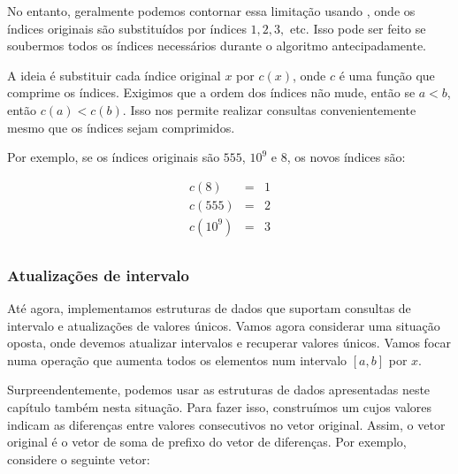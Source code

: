 
No entanto, geralmente podemos contornar essa limitação
usando ,
onde os índices originais são substituídos
por índices $1,2,3,$ etc.
Isso pode ser feito se soubermos todos os índices
necessários durante o algoritmo antecipadamente.

A ideia é substituir cada índice original $x$
por $c(x)$, onde $c$ é uma função que
comprime os índices.
Exigimos que a ordem dos índices
não mude, então se $a<b$, então $c(a)<c(b)$.
Isso nos permite realizar consultas convenientemente
mesmo que os índices sejam comprimidos.

Por exemplo, se os índices originais são
$555$, $10^9$ e $8$, os novos índices são:

\[
\begin{array}{lcl}
c(8) & = & 1 \\
c(555) & = & 2 \\
c(10^9) & = & 3 \\
\end{array}
\]

\subsubsection{Atualizações de intervalo}

Até agora, implementamos estruturas de dados
que suportam consultas de intervalo e atualizações
de valores únicos.
Vamos agora considerar uma situação oposta,
onde devemos atualizar intervalos e
recuperar valores únicos.
Vamos focar numa operação que aumenta todos
os elementos num intervalo $[a,b]$ por $x$.


Surpreendentemente, podemos usar as estruturas de dados
apresentadas neste capítulo também nesta situação.
Para fazer isso, construímos um 
cujos valores indicam
as diferenças entre valores consecutivos
no vetor original.
Assim, o vetor original é o
vetor de soma de prefixo do
vetor de diferenças.
Por exemplo, considere o seguinte vetor:

\begin{center}
\end{center}

